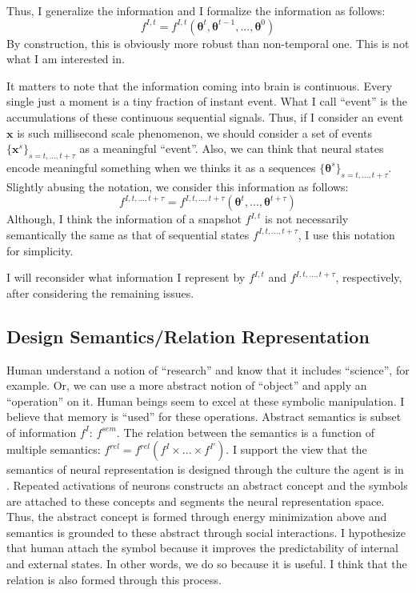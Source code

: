 \documentclass[12pt]{article}
\begin{document}
Thus, I generalize the information and I formalize the information as follows:
\begin{equation}
    f^{I, t} = f^{I, t}(\bm{\theta}^t, \bm{\theta}^{t - 1}, ..., \bm{\theta}^{0})
\end{equation}
By construction, this is obviously more robust than non-temporal one. This is not what I am interested in.

It matters to note that the information coming into brain is continuous. 
Every single just a moment is a tiny fraction of instant event. What I call 
``event'' is the accumulations of these continuous sequential signals. 
Thus, if I consider an event $\bm{x}$ is such millisecond scale phenomenon, 
we should consider a set of events $\{ \bm{x}^{s} \}_{s=t,...,t+\tau}$ as a meaningful ``event''.
Also, we can think that neural states encode meaningful something when we thinks it as 
a sequences $\{ \bm{\theta}^{s} \}_{s=t,...,t+\tau}$. Slightly abusing the notation, 
we consider this information as follows:
\begin{equation}
    f^{I, t, ..., t + \tau} = f^{I, t, ..., t + \tau}(\bm{\theta}^t, ..., \bm{\theta}^{t + \tau})
\end{equation}
Although, I think the information of a snapshot $f^{I, t}$ is not necessarily semantically the same as 
that of sequential states $f^{I, t, ..., t + \tau}$, I use this notation for simplicity. 

I will reconsider what information I represent by $f^{I, t}$ and $f^{I, t, ..., t + \tau}$, respectively, 
after considering the remaining issues.

\subsection{Design Semantics/Relation Representation}
Human understand a notion of ``research'' and know that it includes ``science'', for example. 
Or, we can use a more abstract notion of ``object'' and apply an ``operation'' on it. Human beings 
seem to excel at these symbolic manipulation. I believe that memory is ``used'' for these operations. 
Abstract semantics is subset of information $f^I$: $f^{sem}$. The relation between the semantics 
is a function of multiple semantics: $f^{rel} = f^{rel}(f^I \times ... \times f^{I'})$. 
I support the view that the semantics of neural representation is designed through the culture 
the agent is in \cite{Santoro21}. Repeated activations of neurons constructs an abstract concept 
and the symbols are attached to these concepts and segments the neural representation space. 
Thus, the abstract concept is formed through energy minimization above and semantics is grounded to these 
abstract through social interactions. I hypothesize that human attach the symbol because it 
improves the predictability of internal and external states. In other words, we do so 
because it is useful. I think that the relation is also formed through this process.
\end{document}
